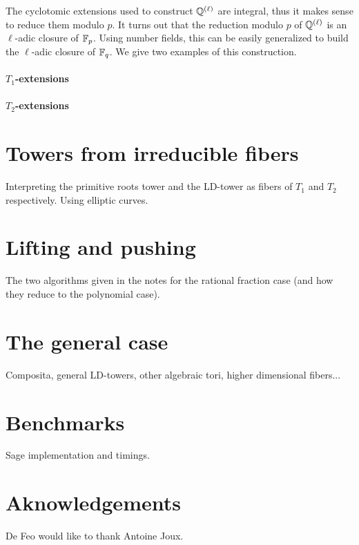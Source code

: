 \documentclass{sig-alternate}
\begin{document}
The cyclotomic extensions used to construct $\mathbb{Q}^{(\ell)}$ are
integral, thus it makes sense to reduce them modulo $p$. It turns out
that the reduction modulo $p$ of $\mathbb{Q}^{(\ell)}$ is an $\ell$-adic
closure of $\mathbb{F}_p$. Using number fields, this can be easily generalized
to build the $\ell$-adic closure of $\mathbb{F}_q$. We give two examples of
this construction.

\paragraph{$T_1$-extensions}

\paragraph{$T_2$-extensions}




\section{Towers from irreducible fibers}
\label{sec:fibers}
Interpreting the primitive roots tower and the LD-tower as fibers of
$T_1$ and $T_2$ respectively. Using elliptic curves.



\section{Lifting and pushing}
\label{sec:lift-push}

The two algorithms given in the notes for the rational fraction case
(and how they reduce to the polynomial case).


\section{The general case}
\label{sec:general}

Composita, general LD-towers, other algebraic tori, higher dimensional
fibers...


\section{Benchmarks}
\label{sec:bench}

Sage implementation and timings.


\section{Aknowledgements}
De Feo would like to thank Antoine Joux.



\end{document}
